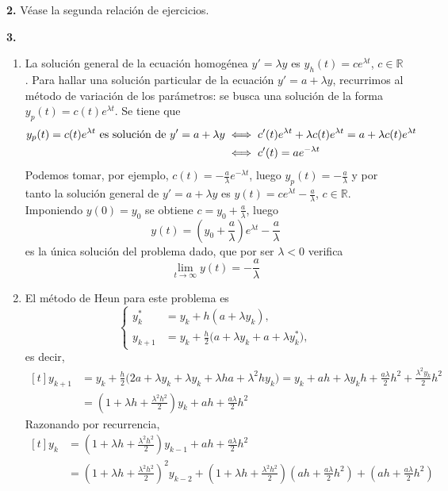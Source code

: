 \documentclass[11pt]{report}
\newcommand{\R}{\mathbb R}
\begin{document}
\textbf{2.} Véase la segunda relación de ejercicios.

\textbf{3.} 

\begin{enumerate}
    \item La solución general de la ecuación homogénea $y'=\lambda y$ es $y_h(t)=ce^{\lambda t}$, $c \in \R$. Para hallar una solución particular de la ecuación $y'=a+\lambda y$, recurrimos al método de variación de los parámetros: se busca una solución de la forma $y_p(t)=c(t)e^{\lambda t}$. Se tiene que
    \[\begin{aligned}[t]
        y_p(t)=c(t)e^{\lambda t} \textup{ es solución de } y'=a+\lambda y &\iff c'(t)e^{\lambda t} +\lambda c(t)e^{\lambda t} = a+\lambda c(t)e^{\lambda t} \\
        &\iff c'(t)=ae^{-\lambda t}
    \end{aligned} 
    \]
    Podemos tomar, por ejemplo, $c(t)=-\frac{a}{\lambda}e^{-\lambda t}$, luego $y_p(t)=-\frac{a}{\lambda}$ y por tanto la solución general de $y'=a+\lambda y$ es $y(t)=ce^{\lambda t}-\frac{a}{\lambda}$, $c \in \R$. Imponiendo $y(0)=y_0$ se obtiene $c = y_0+\frac{a}{\lambda}$, luego
    \[y(t)=\left(y_0+\frac{a}{\lambda}\right)e^{\lambda t}-\frac{a}{\lambda}\]
    es la única solución del problema dado, que por ser $\lambda <0$ verifica
    \[\lim_{t \to \infty} y(t)=-\frac{a}{\lambda}\]
    \item El método de Heun para este problema es
    \[\left\{\begin{alignedat}{1}
    y_k^{*} &= y_k+h(a+\lambda y_k), \\
    y_{k+1} &= y_k+\frac{h}{2}\bigl(a+\lambda y_k+a+\lambda y_k^*\bigr),
\end{alignedat}\right.\]
es decir,
\[
\begin{aligned}[t]
    y_{k+1} &= y_k+\frac{h}{2}\bigl(2a+\lambda y_k+\lambda y_k+\lambda h a + \lambda^2h y_k\bigr) = y_k+ah+\lambda y_kh+\frac{a\lambda}{2}h^2+\frac{\lambda^2y_k}{2}h^2 \\
    &= \left(1+\lambda h +\frac{\lambda^2h^2}{2}\right)y_k + ah+\frac{a\lambda}{2}h^2
\end{aligned}
\]
Razonando por recurrencia,
\[
\begin{aligned}[t]
    y_k &= \left(1+\lambda h +\frac{\lambda^2h^2}{2}\right)y_{k-1} + ah+\frac{a\lambda}{2}h^2 \\
    &= \left(1+\lambda h +\frac{\lambda^2h^2}{2}\right)^2y_{k-2} + \left(1+\lambda h +\frac{\lambda^2h^2}{2}\right)\left(ah+\frac{a\lambda}{2}h^2\right)+\left(ah+\frac{a\lambda}{2}h^2\right) \\

\end{aligned}\]
\end{enumerate}
\end{document}
